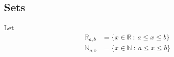 \documentclass[12pt]{article}
\newcommand{\imgRef}[1]{(fig \ref{#1} on page \pageref{#1})}
\begin{document}
\subsection{Sets}
Let
\begin{align}\label{set:Rab}
\mathbb R_{a, b} &= \{x \in \mathbb R~:~ a\leq x \leq b\}\\ \label{set:Nab}
\mathbb N_{a,b} & = \{x \in \mathbb N~:~a\leq x \leq b\}
\end{align}
%
\end{document}
